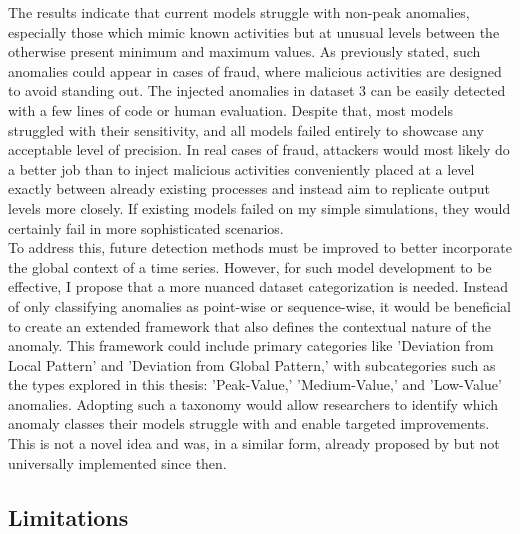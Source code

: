 \documentclass[12pt,oneside]{article}
\begin{document}
The results indicate that current models struggle with non-peak anomalies, especially those which mimic known activities but at unusual levels between the otherwise present minimum and maximum values. As previously stated, such anomalies could appear in cases of fraud, where malicious activities are designed to avoid standing out. The injected anomalies in dataset 3 can be easily detected with a few lines of code or human evaluation. Despite that, most models struggled with their sensitivity, and all models failed entirely to showcase any acceptable level of precision. In real cases of fraud, attackers would most likely do a better job than to inject malicious activities conveniently placed at a level exactly between already existing processes and instead aim to replicate output levels more closely. If existing models failed on my simple simulations, they would certainly fail in more sophisticated scenarios. \\
To address this, future detection methods must be improved to better incorporate the global context of a time series. However, for such model development to be effective, I propose that a more nuanced dataset categorization is needed. Instead of only classifying anomalies as point-wise or sequence-wise, it would be beneficial to create an extended framework that also defines the contextual nature of the anomaly. This framework could include primary categories like 'Deviation from Local Pattern' and 'Deviation from Global Pattern,' with subcategories such as the types explored in this thesis: 'Peak-Value,' 'Medium-Value,' and 'Low-Value' anomalies. Adopting such a taxonomy would allow researchers to identify which anomaly classes their models struggle with and enable targeted improvements. This is not a novel idea and was, in a similar form, already proposed by \cite{NEURIPS} but not universally implemented since then.


\subsection{Limitations}
\end{document}
